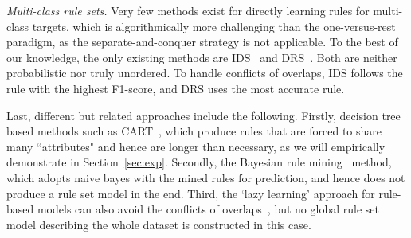 \smallskip \noindent
\emph{Multi-class rule sets.}
Very few methods exist for directly learning rules for multi-class targets, which is algorithmically more challenging than the one-versus-rest paradigm, as the separate-and-conquer strategy is not applicable. 
To the best of our knowledge, the only existing methods are IDS~\citep{lakkaraju2016interpretable} and DRS~\citep{zhang2020diverseRuleSets}. Both are neither probabilistic nor truly unordered. To handle conflicts of overlaps, IDS follows the rule with the highest F1-score, and DRS uses the most accurate rule. 

Last, different but related approaches include the following. Firstly,  decision tree based methods such as CART~\citep{breiman1984classification}, which produce rules that are forced to share many ``attributes" and hence are longer than necessary, as we will empirically demonstrate in Section~\ref{sec:exp}. Secondly, the Bayesian rule mining~\citep{gay2012bayesian} method, which adopts naive bayes  with the mined rules for prediction, and hence does not produce a rule set model in the end. Third, the `lazy learning' approach for rule-based models can also avoid the conflicts of overlaps~\citep{veloso2006lazy}, but no global rule set model describing the whole dataset is constructed in this case.



